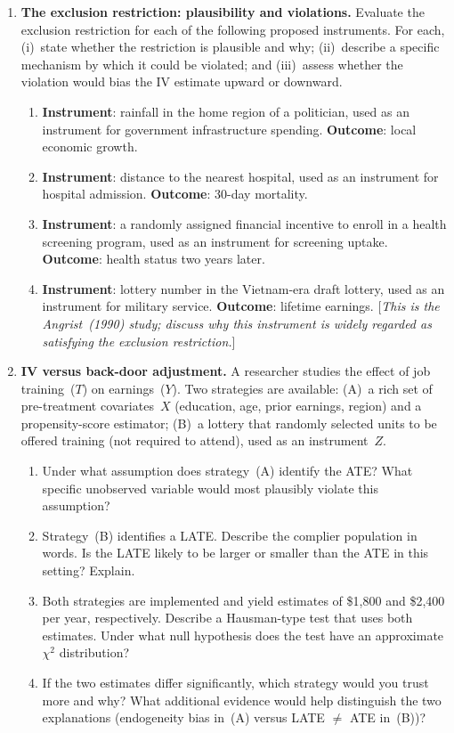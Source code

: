 \documentclass[master.tex]{subfiles}
\begin{document}
\begin{enumerate}
\item \textbf{The exclusion restriction: plausibility and
  violations.}
  Evaluate the exclusion restriction for each of the following
  proposed instruments.  For each, (i)~state whether the
  restriction is plausible and why; (ii)~describe a specific
  mechanism by which it could be violated; and (iii)~assess
  whether the violation would bias the IV estimate upward or
  downward.
  \begin{enumerate}
    \item \textbf{Instrument}: rainfall in the home region of a
      politician, used as an instrument for government
      infrastructure spending.  \textbf{Outcome}: local economic
      growth.
    \item \textbf{Instrument}: distance to the nearest hospital,
      used as an instrument for hospital admission.
      \textbf{Outcome}: 30-day mortality.
    \item \textbf{Instrument}: a randomly assigned financial
      incentive to enroll in a health screening program, used as
      an instrument for screening uptake.  \textbf{Outcome}:
      health status two years later.
    \item \textbf{Instrument}: lottery number in the Vietnam-era
      draft lottery, used as an instrument for military service.
      \textbf{Outcome}: lifetime earnings.
      [\emph{This is the Angrist~(1990) study; discuss why this
      instrument is widely regarded as satisfying the exclusion
      restriction.}]
  \end{enumerate}

\item \textbf{IV versus back-door adjustment.}
  A researcher studies the effect of job training~($T$) on
  earnings~($Y$).  Two strategies are available: (A)~a rich set
  of pre-treatment covariates~$X$ (education, age, prior earnings,
  region) and a propensity-score estimator; (B)~a lottery that
  randomly selected units to be offered training (not required to
  attend), used as an instrument~$Z$.
  \begin{enumerate}
    \item Under what assumption does strategy~(A) identify the
      ATE?  What specific unobserved variable would most plausibly
      violate this assumption?
    \item Strategy~(B) identifies a LATE.  Describe the complier
      population in words.  Is the LATE likely to be larger or
      smaller than the ATE in this setting?  Explain.
    \item Both strategies are implemented and yield estimates
      of \$1{,}800 and \$2{,}400 per year, respectively.
      Describe a Hausman-type test that uses both estimates.
      Under what null hypothesis does the test have an
      approximate $\chi^2$ distribution?
    \item If the two estimates differ significantly, which
      strategy would you trust more and why?  What additional
      evidence would help distinguish the two explanations
      (endogeneity bias in~(A) versus LATE $\neq$ ATE in~(B))?
  \end{enumerate}

\end{enumerate}

\ifSubfilesClassLoaded{%
  
  
}{}
\end{document}
